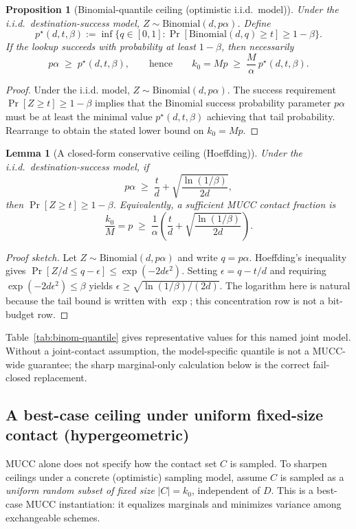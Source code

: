 \documentclass[11pt]{article}
\newtheorem{lemma}{Lemma}
\newtheorem{proposition}{Proposition}
\begin{document}
\begin{proposition}[Binomial-quantile ceiling (optimistic i.i.d.\ model)]
\label{prop:binom-quantile-ceiling}
Under the i.i.d.\ destination-success model, $Z\sim \mathrm{Binomial}(d,p\alpha)$.
Define
\[
p^\star(d,t,\beta) := \inf\{q\in[0,1] : \Pr[\mathrm{Binomial}(d,q)\ge t]\ge 1-\beta\}.
\]
If the lookup succeeds with probability at least $1-\beta$, then necessarily
\[
p\alpha \;\ge\; p^\star(d,t,\beta),
\qquad\text{hence}\qquad
k_0 = Mp \;\ge\; \frac{M}{\alpha}\,p^\star(d,t,\beta).
\]
\end{proposition}

\begin{proof}
Under the i.i.d. model, $Z\sim\mathrm{Binomial}(d,p\alpha)$.
The success requirement $\Pr[Z\ge t]\ge 1-\beta$ implies that the Binomial success probability parameter $p\alpha$ must be at least the minimal value $p^\star(d,t,\beta)$ achieving that tail probability.
Rearrange to obtain the stated lower bound on $k_0=Mp$.
\end{proof}

\begin{lemma}[A closed-form conservative ceiling (Hoeffding)]
\label{lem:hoeffding-ceiling}
Under the i.i.d.\ destination-success model, if
\[
p\alpha \;\ge\; \frac{t}{d} + \sqrt{\frac{\ln(1/\beta)}{2d}},
\]
then $\Pr[Z\ge t]\ge 1-\beta$.
Equivalently, a sufficient MUCC contact fraction is
\[
\frac{k_0}{M}=p \;\ge\; \frac{1}{\alpha}\left(\frac{t}{d} + \sqrt{\frac{\ln(1/\beta)}{2d}}\right).
\]
\end{lemma}

\begin{proof}[Proof sketch]
Let $Z\sim\mathrm{Binomial}(d,p\alpha)$ and write $q=p\alpha$.
Hoeffding's inequality gives $\Pr[Z/d \le q-\epsilon]\le \exp(-2d\epsilon^2)$.
Setting $\epsilon = q - t/d$ and requiring $\exp(-2d\epsilon^2)\le\beta$ yields $\epsilon\ge\sqrt{\ln(1/\beta)/(2d)}$.
The logarithm here is natural because the tail bound is written with $\exp$; this concentration row is not a bit-budget row.
\end{proof}

Table~\ref{tab:binom-quantile} gives representative values for this named joint model.  Without a joint-contact assumption, the model-specific quantile is not a MUCC-wide guarantee; the sharp marginal-only calculation below is the correct fail-closed replacement.

\subsection{A best-case ceiling under uniform fixed-size contact (hypergeometric)}
MUCC alone does not specify how the contact set $C$ is sampled.
To sharpen ceilings under a concrete (optimistic) sampling model, assume $C$ is sampled as a \emph{uniform random subset of fixed size} $|C|=k_0$, independent of $D$.
This is a best-case MUCC instantiation: it equalizes marginals and minimizes variance among exchangeable schemes.
\end{document}
